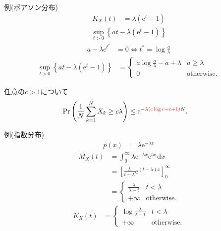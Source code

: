 \documentclass[lualatex,handout]{beamer}
\newcommand{\emm}[1]{\textcolor{red}{#1}}
\newcommand\dx{{\,\mathrm{d}x}}
\theoremstyle{definition}
\begin{document}
\begin{frame}{例(ポアソン分布)}
\begin{align*}
K_X(t) &= \lambda(\mathrm{e}^t-1)
\end{align*}
\begin{align*}
\sup_{t>0}\left\{at - \lambda(\mathrm{e}^t-1)\right\}
\end{align*}
\begin{align*}
a-\lambda\mathrm{e}^{t^*} &= 0\iff t^* = \log \frac{a}{\lambda}
\end{align*}
\begin{align*}
\sup_{t>0}\left\{at - \lambda(\mathrm{e}^t-1)\right\} &=
\begin{cases}
a\log\frac{a}{\lambda} -a + \lambda& a \ge \lambda\\
0&\text{otherwise.}
\end{cases}
\end{align*}

\vspace{1em}
任意の$c > 1$について
\begin{align*}
\Pr\left(\frac1N\sum_{k=1}^N X_k \ge c\lambda\right) &\le \mathrm{e}^{-\emm{\lambda\left(c\log c -c + 1 \right)}N}.
\end{align*}
\end{frame}

\begin{frame}{例(指数分布)}
\begin{align*}
p(x) &= \lambda\mathrm{e}^{-\lambda x}
\end{align*}
\begin{align*}
M_X(t) &= \int_{0}^\infty \lambda\mathrm{e}^{-\lambda x} \mathrm{e}^{tx}\dx\\
&=\left[\frac{\lambda}{t-\lambda}\mathrm{e}^{(t-\lambda)x}\right]_0^{\infty}\\
&=\begin{cases}
\frac{\lambda}{\lambda-t}& t < \lambda\\
+\infty&\text{otherwise.}
\end{cases}
\end{align*}
\begin{align*}
K_X(t) &=
\begin{cases}
\log\frac{\lambda}{\lambda-t}& t < \lambda\\
+\infty&\text{otherwise.}
\end{cases}
\end{align*}
\end{frame}
\end{document}
